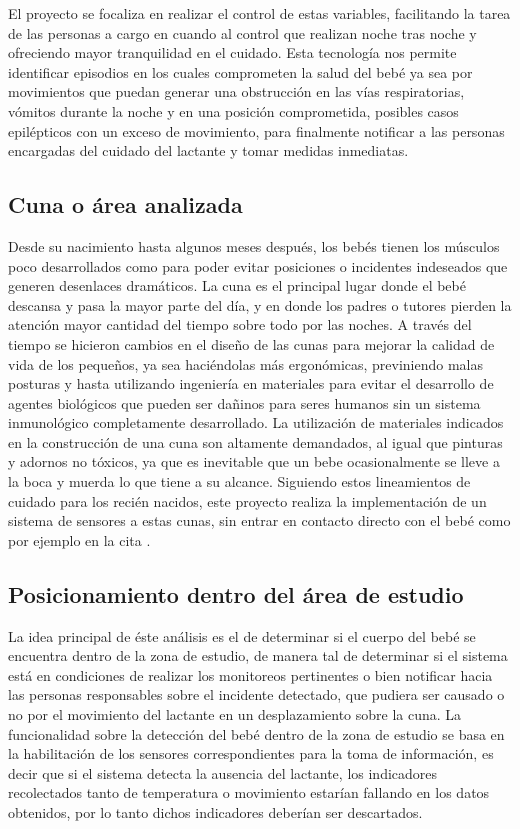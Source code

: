 \documentclass{IEEEtran}
\begin{document}
		El proyecto se focaliza en realizar el control de estas variables, facilitando la tarea de las personas a cargo en cuando al control que realizan noche tras noche y ofreciendo mayor tranquilidad en el cuidado. Esta tecnología nos permite identificar episodios en los cuales comprometen la salud del bebé ya sea por movimientos que puedan generar una obstrucción en las vías respiratorias, vómitos durante la noche y en una posición comprometida, posibles casos epilépticos con un exceso de movimiento, para finalmente notificar a las personas encargadas del cuidado del lactante y tomar medidas inmediatas.

		\subsection{Cuna o área analizada}

			Desde su nacimiento hasta algunos meses después, los bebés tienen los músculos poco desarrollados como para poder evitar posiciones o incidentes indeseados que generen desenlaces dramáticos. La cuna es el principal lugar donde el bebé descansa y pasa la mayor parte del día, y en donde los padres o tutores pierden la atención mayor cantidad del tiempo sobre todo por las noches. A través del tiempo se hicieron cambios en el diseño de las cunas para mejorar la calidad de vida de los pequeños, ya sea haciéndolas más ergonómicas, previniendo malas posturas y hasta utilizando ingeniería en materiales para evitar el desarrollo de agentes biológicos que pueden ser dañinos para seres humanos sin un sistema inmunológico completamente desarrollado. La utilización de materiales indicados en la construcción de una cuna son altamente demandados, al igual que pinturas y adornos no tóxicos, ya que es inevitable que un bebe ocasionalmente se lleve a la boca y muerda lo que tiene a su alcance. Siguiendo estos lineamientos de cuidado para los recién nacidos, este proyecto realiza la implementación de un sistema de sensores a estas cunas, sin entrar en contacto directo con el bebé como por ejemplo en la cita \cite{broussard2002baby}.
		
		\subsection{Posicionamiento dentro del área de estudio}

			La idea principal de éste análisis es el de determinar si el cuerpo del bebé se encuentra dentro de la zona de estudio, de manera tal de determinar si el sistema está en condiciones de realizar los monitoreos pertinentes o bien notificar hacia las personas responsables sobre el incidente detectado, que pudiera ser causado o no por el movimiento del lactante en un desplazamiento sobre la cuna. La funcionalidad sobre la detección del bebé dentro de la zona de estudio se basa en la habilitación de los sensores correspondientes para la toma de información, es decir que si el sistema detecta la ausencia del lactante, los indicadores recolectados tanto de temperatura o movimiento estarían fallando en los datos obtenidos, por lo tanto dichos indicadores deberían ser descartados.
		
\end{document}
